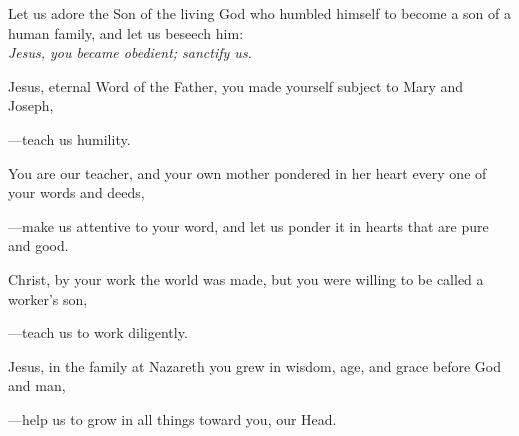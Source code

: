 \intercessions\indent

\begin{hangpar}

Let us adore the Son of the living God who humbled himself to become a son of a human family, and let us beseech him:\\
\emph{Jesus, you became obedient; sanctify us.}

\medskip Jesus, eternal Word of the Father, you made yourself subject to Mary and Joseph,

{\color{red}---\thinspace}teach us humility.

\medskip You are our teacher, and your own mother pondered in her heart every one of your words and deeds,

{\color{red}---\thinspace}make us attentive to your word, and let us ponder it in hearts that are pure and good.

\medskip Christ, by your work the world was made, but you were willing to be called a worker’s son,

{\color{red}---\thinspace}teach us to work diligently.

\medskip Jesus, in the family at Nazareth you grew in wisdom, age, and grace before God and man,

{\color{red}---\thinspace}help us to grow in all things toward you, our Head.

\medskip

\end{hangpar}